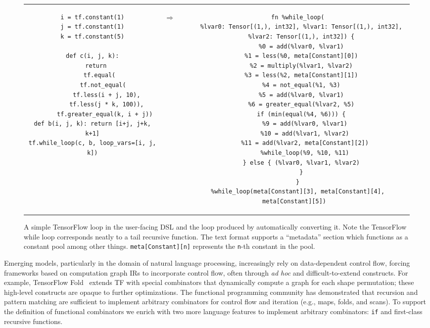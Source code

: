\begin{figure*}[htb!]
  \begin{tabular}{ccc}
  \begin{minipage}{0.4\textwidth}
  \begin{verbatim}
i = tf.constant(1)
j = tf.constant(1)
k = tf.constant(5)

def c(i, j, k):
  return
    tf.equal(
      tf.not_equal(
        tf.less(i + j, 10),
        tf.less(j * k, 100)),
       tf.greater_equal(k, i + j))
def b(i, j, k): return [i+j, j+k, k+1]
tf.while_loop(c, b, loop_vars=[i, j, k])
  \end{verbatim}
  \end{minipage}
& \hspace{-2.0em}
\begin{Huge}
  $\Rightarrow$
\end{Huge}
&
  \begin{minipage}{0.5\textwidth}
  \begin{verbatim}
  fn %while_loop(
    %lvar0: Tensor[(1,), int32], %lvar1: Tensor[(1,), int32],
    %lvar2: Tensor[(1,), int32]) {
    %0 = add(%lvar0, %lvar1)
    %1 = less(%0, meta[Constant][0])
    %2 = multiply(%lvar1, %lvar2)
    %3 = less(%2, meta[Constant][1])
    %4 = not_equal(%1, %3)
    %5 = add(%lvar0, %lvar1)
    %6 = greater_equal(%lvar2, %5)
    if (min(equal(%4, %6))) {
      %9 = add(%lvar0, %lvar1)
      %10 = add(%lvar1, %lvar2)
      %11 = add(%lvar2, meta[Constant][2])
      %while_loop(%9, %10, %11)
    } else { (%lvar0, %lvar1, %lvar2)
    }
  }
  %while_loop(meta[Constant][3], meta[Constant][4], meta[Constant][5])
  \end{verbatim}
  \end{minipage}
  \end{tabular}
  \caption{\textmd{
    A simple TensorFlow loop in the user-facing DSL and the \relay
      loop produced by automatically converting it.
    Note the TensorFlow while loop corresponds neatly to a tail recursive
      function.
    The \relay text format supports a ``metadata'' section which functions
      as a constant pool among other things.
    \texttt{meta[Constant][n]} represents the \texttt{n}-th constant in the
      pool.
  }}
  \label{fig:tf_to_relay_loop}
  \end{figure*}

Emerging models, particularly in the domain of natural language processing, increasingly
  rely on data-dependent control flow, forcing frameworks based on computation graph IRs
  to incorporate control flow, often through \textit{ad hoc} and difficult-to-extend constructs.
For example, TensorFlow Fold~\citep{tf_fold} extends TF with special combinators that
  dynamically compute a graph for each shape permutation;
  these high-level constructs are opaque to further optimizations.
The functional programming community has demonstrated that recursion and pattern matching are sufficient
  to implement arbitrary combinators for control flow and iteration (e.g., maps, folds, and scans).
To support the definition of functional combinators
  we enrich \relay with two more language
  features to implement arbitrary combinators: \verb|if| and first-class recursive functions.

